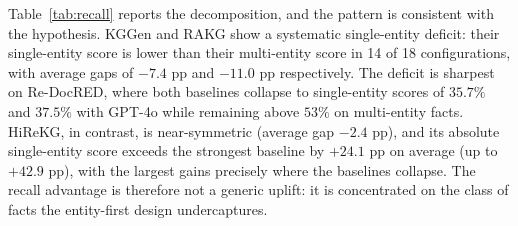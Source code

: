 \documentclass[11pt]{article}
\begin{document}
Table~\ref{tab:recall} reports the decomposition, and the pattern is consistent with the hypothesis. KGGen and RAKG show a systematic single-entity deficit: their single-entity score is lower than their multi-entity score in 14 of 18 configurations, with average gaps of $-7.4$ pp and $-11.0$ pp respectively. The deficit is sharpest on Re-DocRED, where both baselines collapse to single-entity scores of $35.7\%$ and $37.5\%$ with GPT-4o while remaining above $53\%$ on multi-entity facts. HiReKG, in contrast, is near-symmetric (average gap $-2.4$ pp), and its absolute single-entity score exceeds the strongest baseline by $+24.1$ pp on average (up to $+42.9$ pp), with the largest gains precisely where the baselines collapse. The recall advantage is therefore not a generic uplift: it is concentrated on the class of facts the entity-first design undercaptures.



\end{document}
